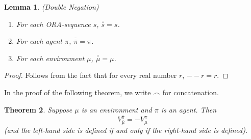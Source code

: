 \documentclass{article}
\newtheorem{theorem}{Theorem}
\newtheorem{lemma}[theorem]{Lemma}
\begin{document}
\begin{lemma}
\label{doublesubtractionlemma}
(Double Negation)
    \begin{enumerate}
        \item For each ORA-sequence $s$, $\overline{\overline s}=s$.
        \item For each agent $\pi$, $\overline{\overline \pi}=\pi$.
        \item For each environment $\mu$, $\overline{\overline \mu}=\mu$.
    \end{enumerate}
\end{lemma}

\begin{proof}
    Follows from the fact that for every real number $r$, $--r=r$.
\end{proof}

In the proof of the following theorem, we write $\frown$ for concatenation.

\begin{theorem}
\label{bigtheorem}
    Suppose $\mu$ is an environment and $\pi$ is an agent.
    Then
    \[
        V^{\overline \pi}_{\overline \mu}=-V^\pi_\mu
    \]
    (and the left-hand side is defined if and only if the right-hand side is defined).
\end{theorem}
\end{document}
